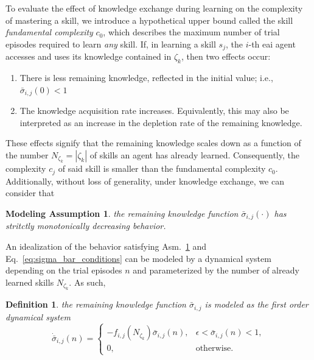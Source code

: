 \documentclass[12pt]{article}
\renewcommand{\emph}[1]{\textit{#1}}
\newtheorem{assumption}{Modeling Assumption}
\newtheorem{definition}{Definition}
\begin{document}
To evaluate the effect of knowledge exchange during learning on the complexity of mastering a skill, we introduce a hypothetical upper bound called the skill \textit{fundamental complexity} $c_0$, which describes the maximum number of trial episodes required to learn \emph{any} skill. If, in learning a skill $ s_{j} $, the $i$-th \ac{eai} agent accesses and uses its knowledge contained in $\mathcal{\zeta}_k$, then two effects occur:
\begin{enumerate}
	\item There is less remaining knowledge, reflected in the initial value; i.e., $\bar{\sigma}_{i,j}(0) < 1$
	\item The knowledge acquisition rate increases. Equivalently, this may also be interpreted as an increase in the depletion rate of the remaining knowledge.
\end{enumerate}
These effects signify that the remaining knowledge scales down as a function of the number $N_{\zeta_k}=|\mathcal{\zeta}_k|$ of skills an agent has already learned. Consequently, the complexity $c_{j}$ of said skill is smaller than the fundamental complexity $c_0$. Additionally, without loss of generality, under knowledge exchange, we can consider that
\begin{tcolorbox}
	\begin{assumption}\label{assumption:exponential_decrease} the remaining knowledge function $\bar{\sigma}_{i,j}(\cdot)$ has stritctly monotonically decreasing behavior.
	\end{assumption}
\end{tcolorbox} 
\noindent An idealization of the behavior satisfying Asm.~\ref{assumption:exponential_decrease} and Eq.~\eqref{eq:sigma_bar_conditions} can be modeled by a dynamical system depending on the trial episodes $n$ and parameterized by the number of already learned skills $N_{\zeta_k}$. As such,
\begin{definition}\label{assumption:ode_model} the remaining knowledge function $\bar{\sigma}_{i,j}$ is modeled as the first order dynamical system
	\begin{equation}\label{eq:simple_knowledge_dynamics}
		\dot{\bar{\sigma}}_{i,j}\left(n\right)=\begin{cases}
			-f_{i,j} \left(N_{\zeta_k} \right) \bar{\sigma}_{i,j}\left(n\right), & \epsilon < \bar{\sigma}_{i,j}\left(n\right) < 1, \\
			0, & \text{otherwise}.
		\end{cases}
	\end{equation}	
\end{definition}
\end{document}
